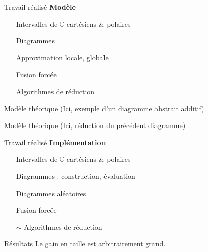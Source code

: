 \begin{frame}{Travail réalisé}
  \textbf{Modèle}
  \begin{itemize}
      \item[\checkmark] Intervalles de $\mathbb C$ cartésiens \& polaires
      \item[\checkmark] Diagrammes
      \item[\checkmark] Approximation locale, globale
      \item[\checkmark] Fusion forcée
      \item[\checkmark] Algorithmes de réduction
  \end{itemize}
\end{frame}

\begin{frame}{Modèle théorique}
  \Huge{(Ici, exemple d'un diagramme abstrait additif)}
\end{frame}

\begin{frame}{Modèle théorique}
  \Huge{(Ici, réduction du précédent diagramme)}
\end{frame}

\begin{frame}{Travail réalisé}
  \textbf{Implémentation}
  \begin{itemize}
      \item[\checkmark] Intervalles de $\mathbb C$ cartésiens \& polaires
      \item[\checkmark] Diagrammes : construction, évaluation
      \item[\checkmark] Diagrammes aléatoires
      \item[\checkmark] Fusion forcée
      \item[$\sim$] Algorithmes de réduction
  \end{itemize}
\end{frame}

\begin{frame}{Résultats}
  Le gain en taille est arbitrairement grand.
\end{frame}
